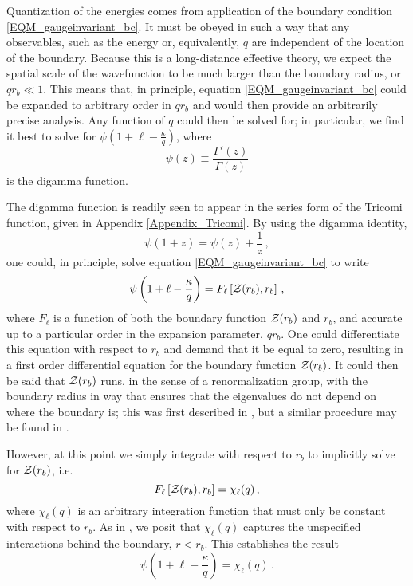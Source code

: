 \documentclass[pra,twocolumn,nofootinbib, superscriptaddress]{revtex4}%
\def\({\left(}
\def\){\right)}
\def\[{\left[}
\def\]{\right]}
\def\f#1#2{\frac{#1}{#2}}
\def\k{\kappa}
\begin{document}
Quantization of the energies comes from application of the boundary condition \eqref{EQM_gaugeinvariant_bc}. It must be obeyed in such a way that any observables, such as the energy or, equivalently, $q$ are independent of the location of the boundary.  Because this is a long-distance effective theory, we expect the spatial scale of the wavefunction to be much larger than the boundary radius, or $qr_b\ll 1$. This means that, in principle, equation \eqref{EQM_gaugeinvariant_bc} could be expanded to arbitrary order in $qr_b$ and would then provide an arbitrarily precise analysis. Any function of $q$ could then be solved for; in particular, we find it best to solve for $\psi\(1+\ell -\f{\k}{q}\)$, where
\begin{equation}
 \psi(z) \equiv \f{\Gamma'(z)}{\Gamma(z)}
\end{equation}
is the digamma function. 

The digamma function is readily seen to appear in the series form of the Tricomi function, given in Appendix \ref{Appendix_Tricomi}. By using the digamma identity,
\begin{equation}\label{dg_identity}
\psi(1+z)=\psi(z)+\f{1}{z}\,,
\end{equation}
one could, in principle, solve equation \eqref{EQM_gaugeinvariant_bc} to write
\begin{equation}
\psi\(1+\ell -\f{\k}{q}\) = F_\ell\[{\cal Z}(r_b),r_b\]\,,
\end{equation}
where $F_\ell$ is a function of both the boundary function ${\cal Z}(r_b)$ and $r_b$, and accurate up to a particular order in the expansion parameter, $qr_b$. One could differentiate this equation with respect to $r_b$ and demand that it be equal to zero, resulting in a first order differential equation for the boundary function ${\cal Z}(r_b)$. It could then be said that ${\cal Z}(r_b)$ runs, in the sense of a renormalization group, with the boundary radius in way that ensures that the eigenvalues do not depend on where the boundary is; this was first described in \cite{Jacobs:2015han}, but a similar procedure may be found in \cite{Burgess:2016lal}.

However, at this point we simply integrate with respect to $r_b$ to implicitly solve for ${\cal Z}(r_b)$, i.e.
\begin{equation}
F_\ell\[{\cal Z}(r_b),r_b\] = \chi_\ell(q)\,,
\end{equation}
where $\chi_\ell(q)$ is an arbitrary integration function that must only be constant with respect to $r_b$. As in \cite{Jacobs:2019woc}, we posit that $\chi_\ell(q)$ captures the unspecified interactions behind the boundary, $r<r_b$. This establishes the result
\begin{equation}
\psi\(1+\ell -\f{\k}{q}\)=\chi_\ell(q)\,.
\end{equation}
\end{document}
